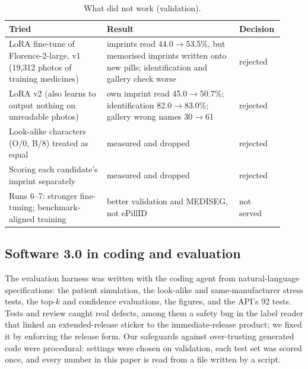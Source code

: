 \begin{table}[t]
  \caption{What did not work (validation).}
  \label{tab:negative}
  \centering
  \small
  \begin{tabular}{@{}p{0.34\linewidth}p{0.46\linewidth}p{0.12\linewidth}@{}}
    \toprule
    Tried & Result & Decision \\
    \midrule
    LoRA fine-tune of Florence-2-large, v1 (19,312 photos of training medicines) & imprints read 44.0$\to$53.5\%, but
      memorised imprints written onto new pills; identification and gallery check worse & rejected \\
    LoRA v2 (also learns to output nothing on unreadable photos) & own imprint read 45.0$\to$50.7\%; identification
      82.0$\to$83.0\%; gallery wrong names 30$\to$61 & rejected \\
    Look-alike characters (O/0, B/8) treated as equal & measured and dropped & rejected \\
    Scoring each candidate's imprint separately & measured and dropped & rejected \\
    Runs 6--7: stronger fine-tuning; benchmark-aligned training & better validation and MEDISEG, not ePillID & not
      served \\
    \bottomrule
  \end{tabular}
\end{table}

\subsection{Software 3.0 in coding and evaluation}
\label{sec:sw3-experiments}

The evaluation harness was written with the coding agent from natural-language specifications: the patient
simulation, the look-alike and same-manufacturer stress tests, the top-$k$ and confidence evaluations, the figures, and
the API's 92 tests. Tests and review caught real defects, among them a safety bug in the label reader that linked an
extended-release sticker to the immediate-release product; we fixed it by enforcing the release form. Our safeguards
against over-trusting generated code were procedural: settings were chosen on validation, each test set was scored
once, and every number in this paper is read from a file written by a script.
